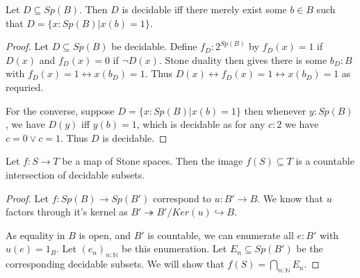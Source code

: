 \begin{lemma}
  Let $D\subseteq Sp(B)$. 
  Then $D$ is decidable iff there merely exist some $b\in B$ such that 
  $D = \{x:Sp(B) | x(b) = 1\}$. 
\end{lemma}
\begin{proof}
  Let $D\subseteq Sp(B)$ be decidable. 
  Define $f_D:2^{Sp(B)}$ by $f_D(x) = 1$ if $D(x)$ and $f_D(x) = 0$ if $\neg D(x)$.
  Stone duality then gives there is some $b_D:B$ with 
  $f_D(x) = 1 \leftrightarrow x(b_D) = 1$. 
  Thus $D(x) \leftrightarrow f_D(x) = 1 \leftrightarrow x(b_D) = 1$ as requried. 

  For the converse, suppose $D  = \{x : Sp(B) | x(b) = 1\}$ then 
  whenever $y:Sp(B)$, we have $D(y)$ iff $y(b) = 1$, which is decidable
  as for any $c:2$ we have $c = 0 \vee c = 1$. 
  Thus $D$ is decidable. 
\end{proof}


\begin{lemma}
  Let $f:S \to T$ be a map of Stone spaces. 
  Then the image $f(S) \subseteq T$ is a countable 
  intersection of decidable subsets. 
\end{lemma}
\begin{proof}
  Let $f:Sp(B) \to Sp(B')$
  correspond to $u:B'\to B$. 
  We know that $u$ factors through it's kernel as 
  $B' \twoheadrightarrow B'/Ker(u) \hookrightarrow B$. 
  
  As equality in $B$ is open, and $B'$ is countable, we can enumerate all 
  $e:B'$ with $u(e) = 1_B$. Let $(e_n)_{n:\mathbb N}$ be this enumeration. 
  Let $E_n\subseteq Sp(B')$ be the corresponding decidable subsets. 
  We will show that $f(S) = \bigcap_{n:\mathbb N} E_n$. 



\end{proof}




